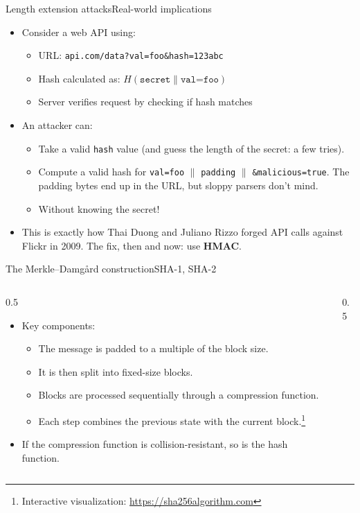 \ifdefined\PRESENTATION\else\PassOptionsToClass{handout}{beamer}\fi\documentclass[aspectratio=169, lualatex]{beamer}
\begin{document}
\begin{frame}{Length extension attacks}{Real-world implications}
	\begin{itemize}
		\item Consider a web API using:
		      \begin{itemize}
			      \item URL: \texttt{api.com/data?val=foo\&hash=123abc}
			      \item Hash calculated as: $H(\texttt{secret} \| \texttt{val=foo})$
			      \item Server verifies request by checking if hash matches
		      \end{itemize}
		\item An attacker can:
		      \begin{itemize}
			      \item Take a valid \texttt{hash} value (and guess the length of the secret: a few tries).
			      \item Compute a valid hash for \texttt{val=foo} $\|$ \texttt{padding} $\|$ \texttt{\&malicious=true}. The padding bytes end up in the URL, but sloppy parsers don't mind.
			      \item Without knowing the secret!
		      \end{itemize}
		\item This is exactly how Thai Duong and Juliano Rizzo forged API calls against Flickr in 2009. The fix, then and now: use \textbf{HMAC}.
	\end{itemize}
\end{frame}

\begin{frame}{The Merkle--Damg\aa rd construction}{SHA-1, SHA-2}
	\begin{columns}[c]
		\begin{column}{0.5\textwidth}
			\begin{itemize}
				\item Key components:
				      \begin{itemize}
					      \item The message is padded to a multiple of the block size.
					      \item It is then split into fixed-size blocks.
					      \item Blocks are processed sequentially through a compression function.
					      \item Each step combines the previous state with the current block.\footnote{Interactive visualization: \url{https://sha256algorithm.com}}
				      \end{itemize}
				\item If the compression function is collision-resistant, so is the hash function.
			\end{itemize}
		\end{column}
		\begin{column}{0.5\textwidth}
		\end{column}
	\end{columns}
\end{frame}
\end{document}
